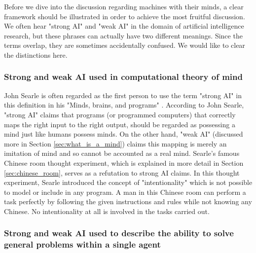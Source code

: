 \documentclass[11pt]{article}
\begin{document}
Before we dive into the discussion regarding machines with their minds, a clear framework should be illustrated in order to achieve the most fruitful discussion. We often hear "strong AI" and "weak AI" in the domain of artificial intelligence research, but these phrases can actually have two different meanings. Since the terms overlap, they are sometimes accidentally confused. We would like to clear the distinctions here.

\subsubsection*{Strong and weak AI used in computational theory of mind}

John Searle is often regarded as the first person to use the term "strong AI" in this definition in his "Minds, brains, and programs" \cite{searle1980minds}. According to John Searle, "strong AI" claims that programs (or programmed computers) that correctly maps the right input to the right output, should be regarded as possessing a mind just like humans possess minds. On the other hand, "weak AI" (discussed more in Section \ref{sec:what_is_a_mind}) claims this mapping is merely an imitation of mind and so cannot be accounted as a real mind. Searle's famous Chinese room thought experiment, which is explained in more detail in Section \ref{sec:chinese_room}, serves as a refutation to strong AI claims. In this thought experiment, Searle introduced the concept of "intentionality" which is not possible to model or include in any program. A man in this Chinese room can perform a task perfectly by following the given instructions and rules while not knowing any Chinese. No intentionality at all is involved in the tasks carried out. 

\subsubsection*{Strong and weak AI used to describe the ability to solve general problems within a single agent}
\end{document}
